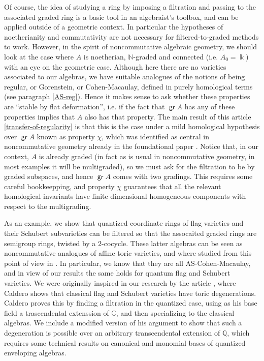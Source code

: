 \documentclass[11pt,fleqn]{article}
\newcommand\NN{\mathbb N}
\newcommand\CC{\mathbb C}
\newcommand\QQ{\mathbb Q}
\renewcommand\k{\Bbbk}
\DeclareMathOperator\gr{\mathsf{gr}}
\begin{document}
Of course, the idea of studying a ring by imposing a filtration and passing to 
the associated graded ring is a basic tool in an algebraist's toolbox, and 
can be applied outside of a geometric context. In 
particular the hypotheses of noetherianity and commutativity are not necessary
for filtered-to-graded methods to work. However, in the spirit of 
noncommutative algebraic geometry, we should look at the case where $A$ is
noetherian, $\NN$-graded and connected (i.e. $A_0 = \k$) with an eye on the
geometric case. Although here there are no varieties associated to our 
algebras, we have suitable analogues of the notions of being regular, or 
Gorenstein, or Cohen-Macaulay, defined in purely homological terms (see 
paragraph \ref{AS-reg}). Hence it makes sense to ask whether these properties 
are ``stable by flat deformation'', i.e. if the fact that $\gr A$ has any of 
these properties implies that $A$ also has that property. 
The main result of this article \ref{transfer-of-regularity} is that this is the case under a mild 
homological hypothesis over $\gr A$ known as property $\chi$, which was 
identified as central in noncommutative geometry already in the 
foundational paper \cite{AZ}. Notice that, in our context, $A$ is already 
graded (in fact as is usual in noncommutative geometry, in most examples it 
will be multigraded), so we must ask for the filtration to be by graded 
subspaces, and hence $\gr A$ comes with two gradings. This requires some 
careful bookkeepping, and property $\chi$ guarantees that all the relevant 
homological invariants have finite dimensional homogeneous components with 
respect to the multigrading.

As an example, we show that quantized coordinate rings of flag varieties and 
their Schubert subvarieties can be filtered so that the assocaited graded 
rings are semigroup rings, twisted by a $2$-cocycle. These latter algebras can 
be seen as noncommutative analogues of affine toric varieties, and where 
studied from this point of view in \cite{RZ2}. In particular, we know that
they are all AS-Cohen-Macaulay, and in view of our results the same holds for
quantum flag and Schubert varieties. We were originally inspired in our 
research by the article \cite{C}, where Caldero shows that classical flag and 
Schubert varieties have toric degenerations. Caldero proves this by finding a 
filtration in the quantized case, using as his base field a trascendental 
extenssion of $\CC$, and then specializing to the classical algebras. We 
include a modified version of his argument to show that such a degeneration is 
possible over an arbitrary transcendental extension of $\QQ$, which requires 
some technical results on canonical and monomial bases of quantized enveloping 
algebras. 
\end{document}
